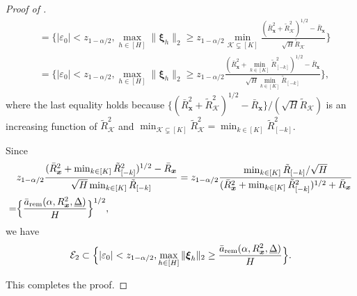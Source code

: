 \documentclass[12pt]{article}
\newcommand{\mk}{\mathcal{K}}
\newcommand{\rem}{\textnormal{rem}}
\newcommand{\bs}{\boldsymbol}
\begin{document}
\begin{proof}[Proof of ]
\begin{align*}
    & = \Big\{|\varepsilon_0| < z_{1-\alpha/2}, \max_{h\in [H]} \|\bs{\xi}_{ h }\|_2 \geq  z_{1-\alpha/2} \min_{\mk \subsetneq [K]}\frac{(\bar{R}_{\bs{x}}^2 +\tilde{R}^2_{\mk})^{1/2}-\bar{R}_{\bs{x}} }{\sqrt{H}\tilde{R}_{\mk}}\Big\}\\
    & = \Big\{|\varepsilon_0| < z_{1-\alpha/2}, \max_{h\in [H]} \|\bs{\xi}_{ h }\|_2 \geq  z_{1-\alpha/2} \frac{(\bar{R}_{\bs{x}}^2 +\min_{k \in [K]} \tilde{R}^2_{[-k]})^{1/2}-\bar{R}_{\bs{x}} }{\sqrt{H} \min_{k \in [K]}\tilde{R}_{ [-k]}}\Big\},
\end{align*}
where the last equality holds because $\big\{(\bar{R}_{\bs{x}}^2 +\tilde{R}^2_{\mk})^{1/2}-\bar{R}_{\bs{x}} \big\}/(\sqrt{H}\tilde{R}_{\mk})$ is an increasing function of $\tilde{R}^2_{\mk}$ and $\min_{\mk \subsetneq [K]} \tilde{R}^2_{\mk} = \min_{k \in [K]}\tilde{R}_{ [-k]}^2$.

Since 
\begin{align*}
    & z_{1-\alpha/2}\frac{(\bar{R}_{\bs{x}}^2 +\min_{k \in [K]} \tilde{R}^2_{[-k]})^{1/2}-\bar{R}_{\bs{x}} }{\sqrt{H} \min_{k \in [K]}\tilde{R}_{ [-k]}} = z_{1-\alpha/2} \frac{\min_{k \in [K]} \tilde{R}_{ [-k]}/\sqrt{H}}{(\bar{R}_{\bs{x}}^2 + \min_{k \in [K]} \tilde{R}^2_{[-k]})^{1/2}+\bar{R}_{\bs{x}}} \\
    =& \Big\{\frac{\bar{a}_{\rem}(\alpha, R^2_{\bs{x}}, \underline{\Delta})}{H}\Big\}^{1/2},
\end{align*}
we have
\begin{align*}
    \mathcal{E}_2  \subset \Big\{|\varepsilon_0| < z_{1-\alpha/2}, \max_{h\in [H]} \|\bs{\xi}_{ h }\|_2 \geq  \frac{\bar{a}_{\rem}(\alpha, R^2_{\bs{x}}, \underline{\Delta})}{H}\Big\}.
\end{align*}


This completes the proof.
\end{proof}
\end{document}
